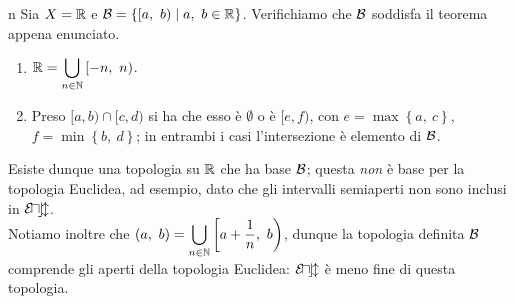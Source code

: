 \begin{example}{n}
Sia $X=\mathbb{R}$ e $\basis=\left\{[a,\ b)\middle| a,\ b\in\R\right\}$. Verifichiamo che $\mathcal{B}$ soddisfa il teorema appena enunciato.
\begin{enumerate}
\item $\displaystyle\mathbb{R}=\bigcup_{n\in \mathbb{N}}\left[-n,\ n\right)$.
\item Preso $[a, b)\cap[c, d)$ si ha che esso è $\emptyset$ o è $[e, f)$, con $e=\max\left\{a,\ c\right\}$, $f=\min\left\{b,\ d\right\}$; in entrambi i casi l'intersezione è elemento di $\mathcal{B}$.
\end{enumerate}
Esiste dunque una topologia su $\mathbb{R}$ che ha base $\mathcal{B}$; questa \textit{non} è base per la topologia Euclidea, ad esempio, dato che gli intervalli semiaperti non sono inclusi in $\mathcal{E\! u\! c\! l}$.\\
Notiamo inoltre che $\displaystyle\left(a,\ b\right)=\bigcup_{n\in \N}\left[a+\frac{1}{n},\ b\right)$, dunque la topologia definita $\mathcal{B}$ comprende gli aperti della topologia Euclidea: $\mathcal{E\! u\! c\! l}$ è meno fine di questa topologia.
\end{example}

